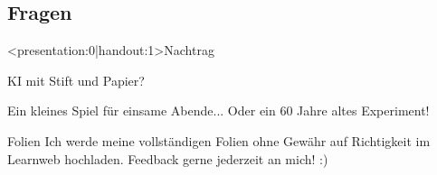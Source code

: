 \documentclass[aspectratio=169,usepdftitle=true,t]{beamer}
\begin{document}
\subsection{Fragen}

\begin{frame}<presentation:0|handout:1>{Nachtrag}
    \begin{block}{KI mit Stift und Papier?}
        \begin{minipage}{0.85\linewidth}
            Ein kleines Spiel für einsame Abende... Oder ein 60 Jahre altes Experiment!
        \end{minipage}\nolinebreak\hfill\begin{minipage}{0.107\linewidth}
            \vspace{0.107cm}
        \end{minipage}
    \end{block}
    \begin{block}{Folien}
        Ich werde meine vollständigen Folien ohne Gewähr auf Richtigkeit im Learnweb hochladen. Feedback gerne jederzeit an mich! :)
    \end{block}
\end{frame}
\end{document}
